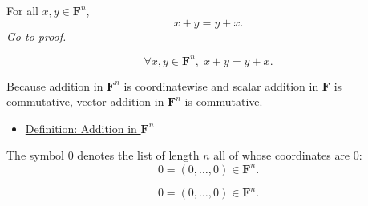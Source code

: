 
\begin{tcolorbox}[colback=thmbox, colframe=thmborder, arc=2pt,
  left=6pt, right=6pt, top=4pt, bottom=4pt,
  title={\small\textbf{Theorem (Addition Is Commutative in $\mathbf{F}^n$)}},
  fonttitle=\small\bfseries]
\begin{theorem}
\label{thm:addition-commutative-in-Fn}
For all $x,y \in \mathbf{F}^n$,
\[
x+y=y+x.
\]
\hyperref[prf:addition-commutative-fn]{\textit{Go to proof.}}
\end{theorem}
\end{tcolorbox}

\begin{remark*}
\[
\forall x,y \in \mathbf{F}^n,\; x+y=y+x.
\]
\end{remark*}

\begin{remark*}[Interpretation]
Because addition in $\mathbf{F}^n$ is coordinatewise and scalar addition in
$\mathbf{F}$ is commutative, vector addition in $\mathbf{F}^n$ is commutative.
\end{remark*}

\begin{remark*}[Dependencies]
\begin{itemize}
  \item \hyperref[def:addition-in-Fn]{Definition: Addition in $\mathbf{F}^n$}
\end{itemize}
\end{remark*}


\begin{tcolorbox}[colback=defbox, colframe=defborder, arc=2pt,
  left=6pt, right=6pt, top=4pt, bottom=4pt,
  title={\small\textbf{Definition (Zero Vector in $\mathbf{F}^n$)}},
  fonttitle=\small\bfseries]
\begin{definition}
\label{def:zero-vector-in-Fn}
The symbol $0$ denotes the list of length $n$ all of whose coordinates are $0$:
\[
0=(0,\dots,0)\in \mathbf{F}^n.
\]
\end{definition}
\end{tcolorbox}

\begin{remark*}
\[
0=(0,\dots,0)\in \mathbf{F}^n.
\]
\end{remark*}

